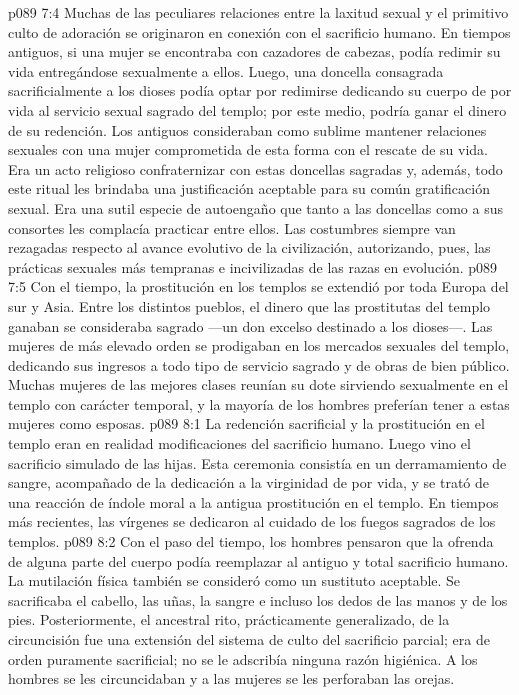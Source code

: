 \vs p089 7:4 \pc Muchas de las peculiares relaciones entre la laxitud sexual y el primitivo culto de adoración se originaron en conexión con el sacrificio humano. En tiempos antiguos, si una mujer se encontraba con cazadores de cabezas, podía redimir su vida entregándose sexualmente a ellos. Luego, una doncella consagrada sacrificialmente a los dioses podía optar por redimirse dedicando su cuerpo de por vida al servicio sexual sagrado del templo; por este medio, podría ganar el dinero de su redención. Los antiguos consideraban como sublime mantener relaciones sexuales con una mujer comprometida de esta forma con el rescate de su vida. Era un acto religioso confraternizar con estas doncellas sagradas y, además, todo este ritual les brindaba una justificación aceptable para su común gratificación sexual. Era una sutil especie de autoengaño que tanto a las doncellas como a sus consortes les complacía practicar entre ellos. Las costumbres siempre van rezagadas respecto al avance evolutivo de la civilización, autorizando, pues, las prácticas sexuales más tempranas e incivilizadas de las razas en evolución.
\vs p089 7:5 Con el tiempo, la prostitución en los templos se extendió por toda Europa del sur y Asia. Entre los distintos pueblos, el dinero que las prostitutas del templo ganaban se consideraba sagrado ---un don excelso destinado a los dioses---. Las mujeres de más elevado orden se prodigaban en los mercados sexuales del templo, dedicando sus ingresos a todo tipo de servicio sagrado y de obras de bien público. Muchas mujeres de las mejores clases reunían su dote sirviendo sexualmente en el templo con carácter temporal, y la mayoría de los hombres preferían tener a estas mujeres como esposas.
\vs p089 8:1 La redención sacrificial y la prostitución en el templo eran en realidad modificaciones del sacrificio humano. Luego vino el sacrificio simulado de las hijas. Esta ceremonia consistía en un derramamiento de sangre, acompañado de la dedicación a la virginidad de por vida, y se trató de una reacción de índole moral a la antigua prostitución en el templo. En tiempos más recientes, las vírgenes se dedicaron al cuidado de los fuegos sagrados de los templos.
\vs p089 8:2 Con el paso del tiempo, los hombres pensaron que la ofrenda de alguna parte del cuerpo podía reemplazar al antiguo y total sacrificio humano. La mutilación física también se consideró como un sustituto aceptable. Se sacrificaba el cabello, las uñas, la sangre e incluso los dedos de las manos y de los pies. Posteriormente, el ancestral rito, prácticamente generalizado, de la circuncisión fue una extensión del sistema de culto del sacrificio parcial; era de orden puramente sacrificial; no se le adscribía ninguna razón higiénica. A los hombres se les circuncidaban y a las mujeres se les perforaban las orejas.
